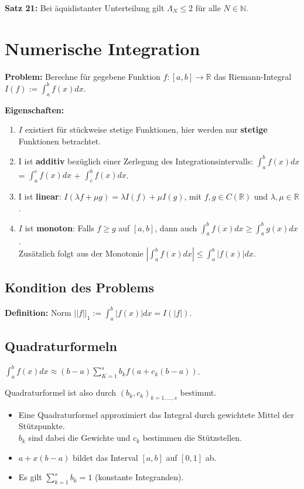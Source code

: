\documentclass[a4paper]{article}
\begin{document}
\vspace{1em}

\textbf{Satz 21:} Bei äquidistanter Unterteilung gilt $\Lambda_N \le 2$ für alle
$N \in \mathbb{N}$.

\section{Numerische Integration}

\textbf{Problem:} Berechne für gegebene Funktion $f: [a, b] \to \mathbb{R}$ das
Riemann-Integral $I(f) := \int_a^b f(x) dx$.

\textbf{Eigenschaften:}
\begin{enumerate}
    \item $I$ existiert für stückweise stetige Funktionen, hier werden nur
    \textbf{stetige} Funktionen betrachtet.
    \item I ist \textbf{additiv} bezüglich einer Zerlegung des
    Integrationsintervalls: $\int_a^b f(x) dx$ = $\int_a^c f(x) dx$ + $\int_c^b
    f(x) dx$.
    \item I ist \textbf{linear}:
    $I(\lambda f + \mu g) = \lambda I(f) + \mu I(g)$, mit $f, g \in
    C(\mathbb{R})$ und $\lambda, \mu \in \mathbb{R}$.
    \item $I$ ist \textbf{monoton}: Falls $f \ge g$ auf $[a, b]$, dann auch
    $\int_a^b f(x) dx \ge \int_a^b g(x) dx$.
    \\
    Zusätzlich folgt aus der Monotonie
    $|\int_a^b f(x) dx| \le \int_a^b |f(x)| dx$.
\end{enumerate}

\subsection{Kondition des Problems}

\textbf{Definition:} Norm $||f||_1 := \int_a^b |f(x)| dx = I(|f|)$.

\subsection{Quadraturformeln}

$\int_a^b f(x) dx \approx (b - a) \sum\limits_{K = 1}^s b_k f(a + c_k(b - a))$.

Quadraturformel ist also durch $(b_k, c_k)_{k = 1, \dots, s}$ bestimmt.

\begin{itemize}
    \item Eine Quadraturformel approximiert das Integral durch gewichtete Mittel
    der Stützpunkte.\\ $b_k$ sind dabei die Gewichte und $c_k$ bestimmen die
    Stützstellen.
    \item $a +  x (b - a)$ bildet das Interval $[a, b]$ auf $[0, 1]$ ab.
    \item Es gilt $\sum\limits_{k = 1}^s b_k = 1$ (konstante Integranden).
\end{itemize}
\end{document}
